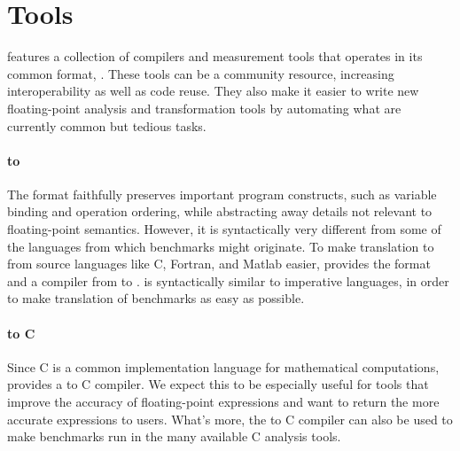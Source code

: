\documentclass[main.tex]{subfiles}
\begin{document}
\section{Tools}
\label{sec:tools}

\name features
  a collection of compilers and measurement tools
  that operates in its common format, \core.
These tools can be a community resource,
  increasing interoperability as well as code reuse.
They also make it easier to write
  new floating-point analysis and transformation tools
  by automating what are currently
  common but tedious tasks.

\paragraph{\surface to \core}
The \core format faithfully preserves important program constructs,
  such as variable binding and operation ordering,
  while abstracting away details not relevant
  to floating-point semantics.
However, it is syntactically very different
  from some of the languages from which benchmarks might originate.
To make translation to \core from source languages
  like C, Fortran, and Matlab easier,
  \name provides the \surface format
  and a compiler from \surface to \core.
\surface is syntactically similar to imperative languages,
  in order to make translation of benchmarks as easy as possible.

\paragraph{\core to C}
Since C is a common implementation language for mathematical computations,
  \name provides a \core to C compiler.
We expect this to be especially useful for tools
  that improve the accuracy of floating-point expressions
  and want to return the more accurate expressions to users.
What's more, the \core to C compiler can also be used to make \core benchmarks
run in the many available C analysis tools.

\begin{comment}
\paragraph{Worst-case error estimation}
\name provides a tool to give bounds on
  the worst-case absolute errors of a \core program
  using an abstract interpretation based on interval analysis
  following the approach pioneered by Martel et~al.~\cite{fmics15}.
The error analysis is fast
  and applies to loops without the need for loop invariants,
  though specialized tools such as Rosa~\cite{DarulovaK14}
  and FPTaylor~\cite{fptaylor-fm15}
  provide tighter error bounds.
For tools that improve the accuracy of floating-point computations,
  the static error analysis is a way to compare
  the original and improved computation,
  while tools that optimize programs given accuracy bounds
  can use the static analysis to derive the accuracy bounds demanded.
\end{comment}
\end{document}
